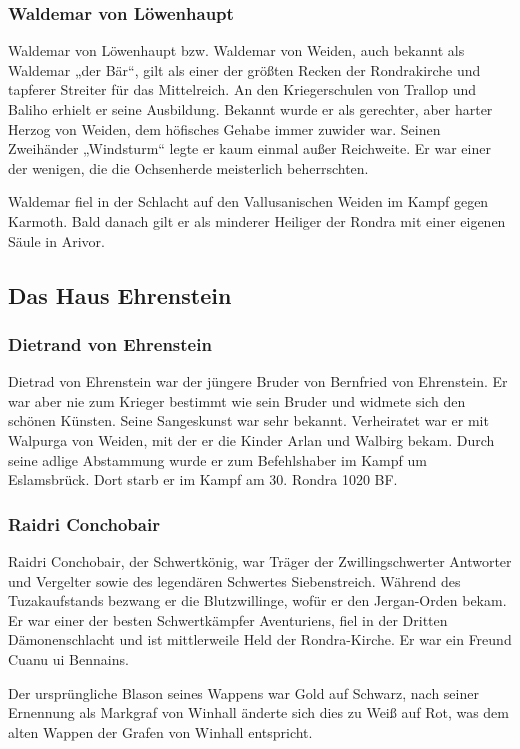 \subsubsection{Waldemar von Löwenhaupt}
Waldemar von Löwenhaupt bzw. Waldemar von Weiden, auch bekannt als Waldemar „der Bär“, gilt als einer der größten Recken der Rondrakirche und tapferer Streiter für das Mittelreich. An den Kriegerschulen von Trallop und Baliho erhielt er seine Ausbildung. Bekannt wurde er als gerechter, aber harter Herzog von Weiden, dem höfisches Gehabe immer zuwider war. Seinen Zweihänder „Windsturm“ legte er kaum einmal außer Reichweite. Er war einer der wenigen, die die Ochsenherde meisterlich beherrschten.

Waldemar fiel in der Schlacht auf den Vallusanischen Weiden im Kampf gegen Karmoth. Bald danach gilt er als minderer Heiliger der Rondra mit einer eigenen Säule in Arivor. 

\subsection{Das Haus Ehrenstein}
\subsubsection{Dietrand von Ehrenstein}
Dietrad von Ehrenstein war der jüngere Bruder von Bernfried von Ehrenstein. Er war aber nie zum Krieger bestimmt wie sein Bruder und widmete sich den schönen Künsten. Seine Sangeskunst war sehr bekannt. Verheiratet war er mit Walpurga von Weiden, mit der er die Kinder Arlan und Walbirg bekam. Durch seine adlige Abstammung wurde er zum Befehlshaber im Kampf um Eslamsbrück. Dort starb er im Kampf am 30. Rondra 1020 BF. 

\subsubsection{Raidri Conchobair}
Raidri Conchobair, der Schwertkönig, war Träger der Zwillingschwerter Antworter und Vergelter sowie des legendären Schwertes Siebenstreich. Während des Tuzakaufstands bezwang er die Blutzwillinge, wofür er den Jergan-Orden bekam. Er war einer der besten Schwertkämpfer Aventuriens, fiel in der Dritten Dämonenschlacht und ist mittlerweile Held der Rondra-Kirche. Er war ein Freund Cuanu ui Bennains.

Der ursprüngliche Blason seines Wappens war Gold auf Schwarz, nach seiner Ernennung als Markgraf von Winhall änderte sich dies zu Weiß auf Rot, was dem alten Wappen der Grafen von Winhall entspricht. 

